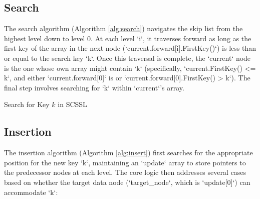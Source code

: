 \documentclass{article}
\begin{document}
\subsection{Search}
The search algorithm (Algorithm \ref{alg:search}) navigates the skip list from the highest level down to level 0. At each level `i`, it traverses forward as long as the first key of the array in the next node (`current.forward[i].FirstKey()`) is less than or equal to the search key `k`. Once this traversal is complete, the `current` node is the one whose own array might contain `k` (specifically, `current.FirstKey() <= k`, and either `current.forward[0]` is \Nil or `current.forward[0].FirstKey() > k`). The final step involves searching for `k` within `current`'s array.

\begin{algorithm}[H]
    \caption{Search for Key $k$ in SCSSL}
    \label{alg:search}
\end{algorithm}

\subsection{Insertion}
The insertion algorithm (Algorithm \ref{alg:insert}) first searches for the appropriate position for the new key `k`, maintaining an `update` array to store pointers to the predecessor nodes at each level. The core logic then addresses several cases based on whether the target data node (`target_node`, which is `update[0]`) can accommodate `k`:
\end{document}
